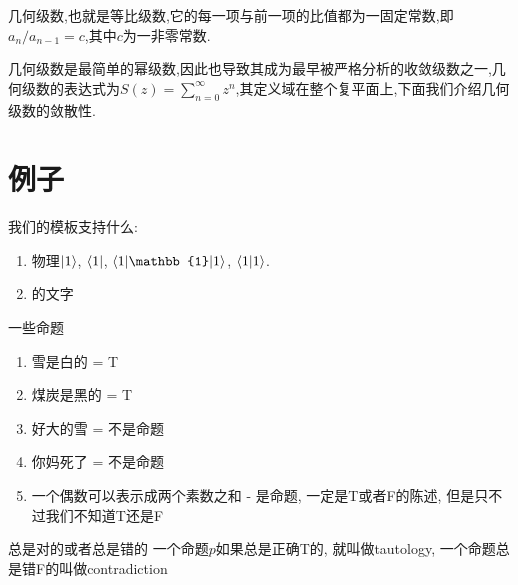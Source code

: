 \documentclass[zihao=-4,a4paper]{ctexart}
\begin{document}
几何级数,也就是等比级数,它的每一项与前一项的比值都为一固定常数,即${a}_{n}/{a}_{n-1}=c$,其中$c$为一非零常数.

几何级数是最简单的幂级数,因此也导致其成为最早被严格分析的收敛级数之一,几何级数的表达式为$S\left(z\right)=\sum^{\infty}_{n=0}{z}^{n}$,其定义域在整个复平面上,下面我们介绍几何级数的敛散性.








\section{例子}
我们的模板支持什么:
\begin{enumerate}
	\item 物理$\ket{1}$, $\bra{1}$, $\mel**{1}{\mathbb{1}}{1}$, $\braket{1}$.
	\item {}的文字
\end{enumerate}
\begin{mexample}{一些命题}
	\begin{enumerate}
		\item 雪是白的 = T
		\item 煤炭是黑的 = T
		\item 好大的雪 = 不是命题
		\item 你妈死了 = 不是命题
		\item 一个偶数可以表示成两个素数之和 - 是命题, 一定是T或者F的陈述, 但是只不过我们不知道T还是F
	\end{enumerate}
\end{mexample}
\begin{mdefinition}{总是对的或者总是错的}
	一个命题$p$如果总是正确T的, 就叫做tautology, 一个命题总是错F的叫做contradiction
\end{mdefinition}
\end{document}
